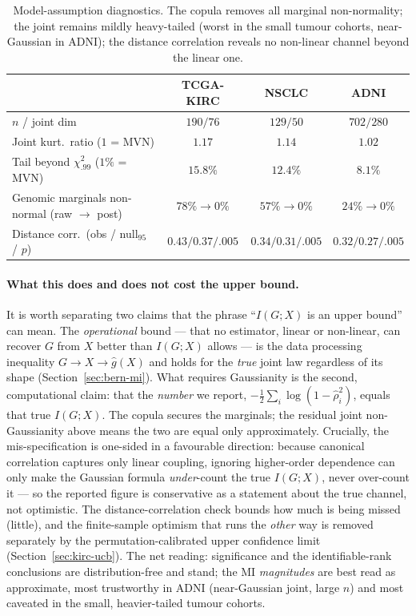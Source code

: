 \documentclass{article}
\begin{document}
\begin{table}[h]
\centering
\small
\begin{tabular}{lccc}
\toprule
 & TCGA-KIRC & NSCLC & ADNI \\
\midrule
$n$ / joint dim                       & $190/76$ & $129/50$ & $702/280$ \\
Joint kurt.\ ratio ($1$ = MVN)         & $1.17$   & $1.14$   & $1.02$ \\
Tail beyond $\chi^2_{.99}$ ($1\%$ = MVN) & $15.8\%$ & $12.4\%$ & $8.1\%$ \\
Genomic marginals non-normal (raw $\to$ post) & $78\%\!\to\!0\%$ & $57\%\!\to\!0\%$ & $24\%\!\to\!0\%$ \\
Distance corr.\ (obs / null$_{95}$ / $p$) & $0.43/0.37/.005$ & $0.34/0.31/.005$ & $0.32/0.27/.005$ \\
\bottomrule
\end{tabular}
\caption{Model-assumption diagnostics. The copula removes all marginal
non-normality; the joint remains mildly heavy-tailed (worst in the small tumour
cohorts, near-Gaussian in ADNI); the distance correlation reveals no non-linear
channel beyond the linear one.}
\label{tab:assumptions}
\end{table}

\paragraph{What this does and does not cost the upper bound.}
It is worth separating two claims that the phrase ``$I(G;X)$ is an upper bound''
can mean. The \emph{operational} bound --- that no estimator, linear or
non-linear, can recover $G$ from $X$ better than $I(G;X)$ allows --- is the data
processing inequality $G \to X \to \hat g(X)$ and holds for the \emph{true} joint
law regardless of its shape (Section~\ref{sec:bern-mi}). What requires Gaussianity
is the second, computational claim: that the \emph{number} we report,
$-\tfrac12\sum_i\log(1-\hat\rho_i^2)$, equals that true $I(G;X)$. The copula
secures the marginals; the residual joint non-Gaussianity above means the two are
equal only approximately. Crucially, the mis-specification is one-sided in a
favourable direction: because canonical correlation captures only linear
coupling, ignoring higher-order dependence can only make the Gaussian formula
\emph{under}-count the true $I(G;X)$, never over-count it --- so the reported
figure is conservative as a statement about the true channel, not optimistic.
The distance-correlation check bounds how much is being missed (little), and the
finite-sample optimism that runs the \emph{other} way is removed separately by
the permutation-calibrated upper confidence limit
(Section~\ref{sec:kirc-ucb}). The net reading: significance and the
identifiable-rank conclusions are distribution-free and stand; the MI
\emph{magnitudes} are best read as approximate, most trustworthy in ADNI
(near-Gaussian joint, large $n$) and most caveated in the small, heavier-tailed
tumour cohorts.
\end{document}
